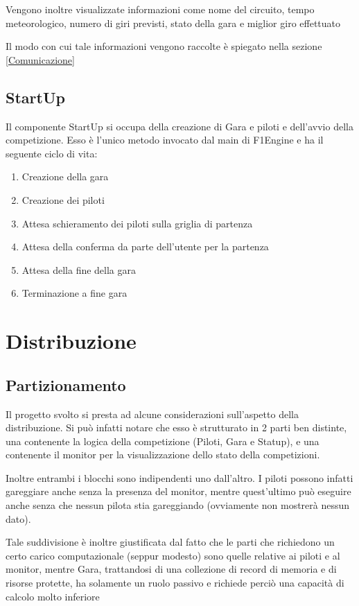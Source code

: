 \documentclass[a4paper,11pt, twoside]{book}
\begin{document}
      Vengono inoltre visualizzate informazioni come nome del circuito, tempo meteorologico, numero di giri previsti,
      stato della gara e miglior giro effettuato

      Il modo con cui tale informazioni vengono raccolte è spiegato nella sezione \ref{Comunicazione}
    
    \section{StartUp}
      Il componente StartUp si occupa della creazione di Gara e piloti e dell'avvio della competizione.
      Esso è l'unico metodo invocato dal main di F1Engine e ha il seguente ciclo di vita:
      
      \begin{enumerate}
	\item Creazione della gara
	\item Creazione dei piloti
	\item Attesa schieramento dei piloti sulla griglia di partenza
	\item Attesa della conferma da parte dell'utente per la partenza
	\item Attesa della fine della gara
	\item Terminazione a fine gara
      \end{enumerate}
      
  \chapter{Distribuzione}
    \section{Partizionamento}
      Il progetto svolto si presta ad alcune considerazioni sull'aspetto della distribuzione. 
      Si può infatti notare che esso è strutturato in 2 parti ben distinte, una contenente la logica della
      competizione (Piloti, Gara e Statup), e una contenente il monitor per la visualizzazione dello
      stato della competizioni.
      
      Inoltre entrambi i blocchi sono indipendenti uno dall'altro. I piloti possono infatti
      gareggiare anche senza la presenza del monitor, mentre quest'ultimo può eseguire anche senza che nessun pilota
      stia gareggiando (ovviamente non mostrerà nessun dato).
      
      Tale suddivisione è inoltre giustificata dal fatto che le parti che richiedono un certo carico computazionale 
      (seppur modesto) sono quelle relative ai piloti e al monitor, mentre
      Gara, trattandosi di una collezione di record di memoria e di risorse protette, ha solamente un ruolo passivo
      e richiede perciò una capacità di calcolo molto inferiore
      
\end{document}
